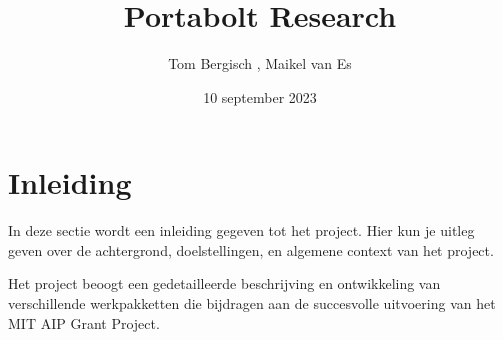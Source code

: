 \documentclass{article}
\title{Portabolt Research } %
\author{Tom Bergisch , Maikel van Es} %
\date{10 september 2023} %
\begin{document}
\maketitle %

\tableofcontents %
\newpage %

\section{Inleiding}
In deze sectie wordt een inleiding gegeven tot het project. Hier kun je uitleg geven over de achtergrond, doelstellingen, en algemene context van het project.

Het project beoogt een gedetailleerde beschrijving en ontwikkeling van verschillende werkpakketten die bijdragen aan de succesvolle uitvoering van het MIT AIP Grant Project.

\end{document}
